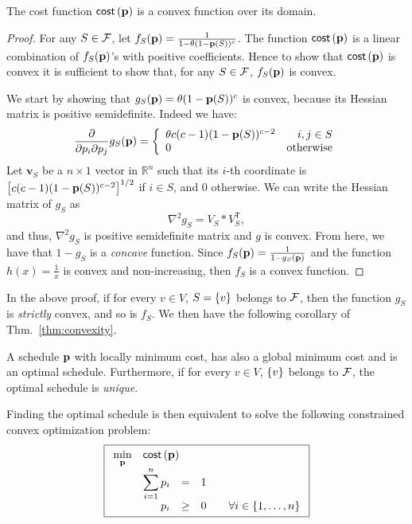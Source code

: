 \begin{theorem}\label{thm:convexity}
	The cost function $\mathsf{cost}\left( \mathbf{p} \right)$ is a convex function over its domain.
\end{theorem}
\begin{proof}
	For any $S\in\mathcal{F}$, let $f_S(\mathbf{p}) = \frac{1}{1 - \theta(1-\mathbf{p}(S))^c}$. The
	function $\mathsf{cost}\left( \mathbf{p} \right)$ is a linear combination of $f_S(\mathbf{p})$'s with positive
	coefficients. Hence to show that $\mathsf{cost}\left( \mathbf{p} \right)$ is convex it is sufficient to
	show that, for any $S\in\mathcal{F}$, $f_S(\mathbf{p})$ is convex.

	We start by showing that $g_S(\mathbf{p}) = \theta(1-\mathbf{p}(S))^c$ is convex, because
	its Hessian matrix is positive semidefinite. Indeed we have:
	\[
		\frac{\partial}{\partial p_i \partial p_j} g_S(\mathbf{p}) = \left\{
		\begin{array}{lr}
		\theta c(c-1) (1-\mathbf{p}(S))^{c-2} &  i,j \in S\\
		0 &  \text{otherwise}
		\end{array}
		\right.
	\]
	Let $\mathbf{v}_S$ be a $n\times 1$ vector in $\mathbb{R}^n$ such that its
	$i$-th coordinate is $\left[c(c-1) (1-\mathbf{p}(S))^{c-2} \right]^{1/2}$ if $i\in
	S$, and $0$ otherwise. We can write the Hessian matrix of $g_S$ as
	\[
		\nabla^2 g_S = V_S * V_S^\mathsf{T},
	\]
	and thus, $\nabla^2 g_S$ is positive semidefinite matrix and $g$ is convex.
	From here, we have that $1-g_S$ is a \emph{concave} function. Since
	$f_S(\mathbf{p})=\frac{1}{1-g_S(\mathbf{p})}$ and the function $h(x)=\frac{1}{x}$ is convex
	and non-increasing, then $f_S$ is a convex function.
	\end{proof}
In the above proof, if for every $v\in V$, $S=\left\{v\right\}$ belongs to $\mathcal{F}$, then the
function $g_S$ is \emph{strictly} convex, and so is $f_S$. We then have the
following corollary of Thm.~\ref{thm:convexity}.

\begin{corollary}
	A schedule $\mathbf{p}$ with locally minimum cost, has also a global minimum cost
	and is an optimal schedule. Furthermore, if for every $v\in V$, $\left\{v\right\}$
	belongs to $\mathcal{F}$, the optimal schedule is \emph{unique}.
\end{corollary}

Finding the optimal schedule is then equivalent to solve the following
constrained convex optimization problem:
\begin{equation}\label{eq:optimization}
	\boxed{
	\begin{array}{rrclcl}
	\displaystyle \min_{\p} & \multicolumn{3}{l}{\cost{\p}} \\
	&\displaystyle \sum_{i=1}^{n} p_i & = & 1 \\
	&p_i & \geq & 0 & & \forall i \in \set{1,\ldots,n} \\
	\end{array} }
\end{equation}

